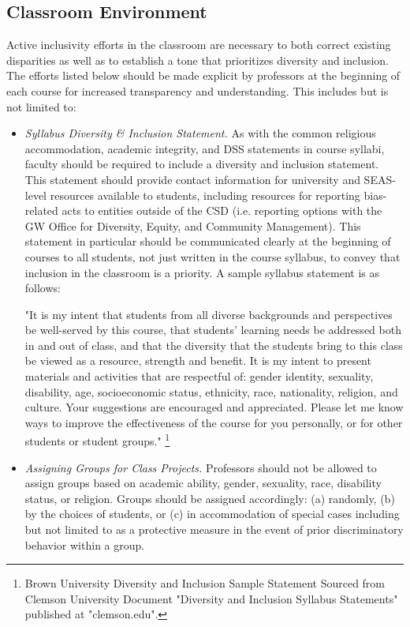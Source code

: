\documentclass{article}
\begin{document}
\subsection{Classroom Environment} 
Active inclusivity efforts in the classroom are necessary to both correct existing disparities as well as to 
establish a tone that prioritizes diversity and inclusion. The efforts listed below should be made explicit by 
professors at the beginning of each course for increased transparency and understanding. 
This includes but is not limited to: 
\begin{itemize}
\item
\emph{Syllabus Diversity \& Inclusion Statement.} 
As with the common religious accommodation, academic integrity, and DSS statements in course syllabi, 
faculty should be required to include a diversity and inclusion statement. 
This statement should provide contact information for 
university and SEAS-level resources available to students, including resources
for reporting bias-related acts to entities outside of the CSD (i.e. reporting options 
with the GW Office for Diversity, Equity, and Community Management). 
This statement in particular should be communicated clearly at the beginning of courses to all students, 
not just written in the course syllabus, to convey that inclusion in the classroom is a priority. 
A sample syllabus statement is as follows: 
\begin{center}
"It is my intent that students from all diverse backgrounds and perspectives be well-served by this course, 
that students' learning needs be addressed both in and out of class, and that the diversity that the students 
bring to this class be viewed as a resource, strength and benefit. It is my intent to present materials and 
activities that are respectful of: gender identity, sexuality, disability, age, socioeconomic status, ethnicity, 
race, nationality, religion, and culture. Your suggestions are encouraged and appreciated. Please let me know ways to 
improve the effectiveness of the course for you personally, or for other students or student groups."
\footnote[1]{
Brown University Diversity and Inclusion Sample Statement Sourced from Clemson University Document "Diversity and Inclusion Syllabus Statements"
published at "clemson.edu".
}

\end{center}
\item
\emph{Assigning Groups for Class Projects.} 
Professors should not be allowed to assign groups based on academic ability, gender, sexuality, race, disability
status, or religion.
Groups should be assigned accordingly: (a) randomly, (b) by the choices of students, or (c) in accommodation of special 
cases including but not limited to as a protective measure in the event of prior discriminatory behavior within a group.


\end{itemize}
\end{document}
